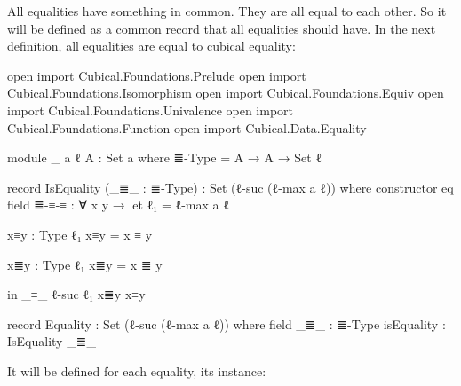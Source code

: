 \documentclass{article}
\begin{document}
All equalities have something in common. They are all equal to each other.
So it will be defined as a common record that all equalities should have.
In the next definition, all equalities are equal to cubical equality:

\begin{code}

open import Cubical.Foundations.Prelude
open import Cubical.Foundations.Isomorphism
open import Cubical.Foundations.Equiv
open import Cubical.Foundations.Univalence
open import Cubical.Foundations.Function
open import Cubical.Data.Equality

module _ {a ℓ} {A : Set a} where
  ≣-Type = A → A → Set ℓ

  record IsEquality (_≣_ : ≣-Type) : Set (ℓ-suc (ℓ-max a ℓ)) where
    constructor eq
    field
      ≣-≡-≡ : ∀ {x y} → let
        ℓ₁ = ℓ-max a ℓ

        x≡y : Type ℓ₁
        x≡y = x ≡ y

        x≣y : Type ℓ₁
        x≣y = x ≣ y

        in _≡_ {ℓ-suc ℓ₁} x≣y x≡y

  record Equality : Set (ℓ-suc (ℓ-max a ℓ)) where
    field
      _≣_ : ≣-Type
      isEquality : IsEquality _≣_
\end{code}

It will be defined for each equality, its instance:
\end{document}
